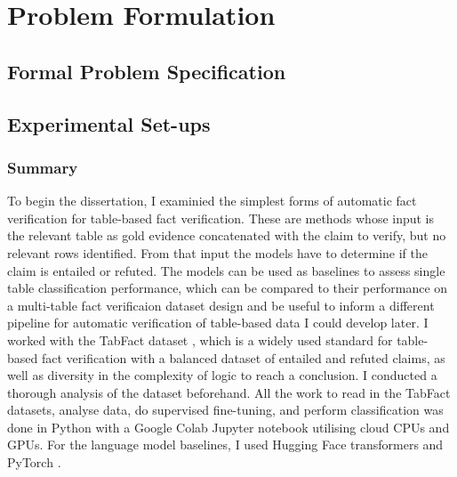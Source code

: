 \chapter{Problem Formulation}

\section{Formal Problem Specification}

\section{Experimental Set-ups}

\subsection{Summary}

To begin the dissertation, I examinied the simplest forms of automatic fact verification for table-based fact verification. These are methods whose input is the relevant table as gold evidence concatenated with the claim to verify, but no relevant rows identified. From that input the models have to determine if the claim is entailed or refuted. The models can be used as baselines to assess single table classification performance, which can be compared to their performance on a multi-table fact verificaion dataset design and be useful to inform a different pipeline for automatic verification of table-based data I could develop later. I worked with the TabFact dataset \parencite{chen2019tabfact}, which is a widely used standard for table-based fact verification with a balanced dataset of entailed and refuted claims, as well as diversity in the complexity of logic to reach a conclusion. I conducted a thorough analysis of the dataset beforehand. All the work to read in the TabFact datasets, analyse data, do supervised fine-tuning, and perform classification was done in Python with a Google Colab Jupyter notebook utilising cloud CPUs and GPUs. For the language model baselines, I used Hugging Face transformers \parencite{wolf2020transformers} and PyTorch \parencite{paszke2019pytorch}.

